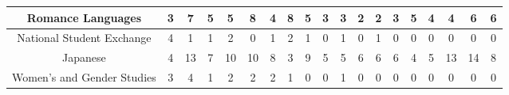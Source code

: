 \documentclass[10]{article}
\begin{document}
\begin{landscape}
\begin{longtable}[c]{|ccccccccccccccccccc|}
	\multicolumn{1}{|c|}{Romance Languages}                          & \multicolumn{1}{c|}{3}          & \multicolumn{1}{c|}{7}          & \multicolumn{1}{c|}{5}          & \multicolumn{1}{c|}{5}          & \multicolumn{1}{c|}{8}          & \multicolumn{1}{c|}{4}          & \multicolumn{1}{c|}{8}          & \multicolumn{1}{c|}{5}          & \multicolumn{1}{c|}{3}          & \multicolumn{1}{c|}{3}          & \multicolumn{1}{c|}{2}          & \multicolumn{1}{c|}{2}          & \multicolumn{1}{c|}{3}          & \multicolumn{1}{c|}{5}          & \multicolumn{1}{c|}{4}          & \multicolumn{1}{c|}{4}          & \multicolumn{1}{c|}{6}          & 6          \\ \hline
	\multicolumn{1}{|c|}{National Student Exchange}                  & \multicolumn{1}{c|}{4}          & \multicolumn{1}{c|}{1}          & \multicolumn{1}{c|}{1}          & \multicolumn{1}{c|}{2}          & \multicolumn{1}{c|}{0}          & \multicolumn{1}{c|}{1}          & \multicolumn{1}{c|}{2}          & \multicolumn{1}{c|}{1}          & \multicolumn{1}{c|}{0}          & \multicolumn{1}{c|}{1}          & \multicolumn{1}{c|}{0}          & \multicolumn{1}{c|}{1}          & \multicolumn{1}{c|}{0}          & \multicolumn{1}{c|}{0}          & \multicolumn{1}{c|}{0}          & \multicolumn{1}{c|}{0}          & \multicolumn{1}{c|}{0}          & 0          \\ \hline
	\multicolumn{1}{|c|}{Japanese}                                   & \multicolumn{1}{c|}{4}          & \multicolumn{1}{c|}{13}         & \multicolumn{1}{c|}{7}          & \multicolumn{1}{c|}{10}         & \multicolumn{1}{c|}{10}         & \multicolumn{1}{c|}{8}          & \multicolumn{1}{c|}{3}          & \multicolumn{1}{c|}{9}          & \multicolumn{1}{c|}{5}          & \multicolumn{1}{c|}{5}          & \multicolumn{1}{c|}{6}          & \multicolumn{1}{c|}{6}          & \multicolumn{1}{c|}{6}          & \multicolumn{1}{c|}{4}          & \multicolumn{1}{c|}{5}          & \multicolumn{1}{c|}{13}         & \multicolumn{1}{c|}{14}         & 8          \\ \hline
	\multicolumn{1}{|c|}{Women's and Gender Studies}                 & \multicolumn{1}{c|}{3}          & \multicolumn{1}{c|}{4}          & \multicolumn{1}{c|}{1}          & \multicolumn{1}{c|}{2}          & \multicolumn{1}{c|}{2}          & \multicolumn{1}{c|}{2}          & \multicolumn{1}{c|}{1}          & \multicolumn{1}{c|}{0}          & \multicolumn{1}{c|}{0}          & \multicolumn{1}{c|}{1}          & \multicolumn{1}{c|}{0}          & \multicolumn{1}{c|}{0}          & \multicolumn{1}{c|}{0}          & \multicolumn{1}{c|}{0}          & \multicolumn{1}{c|}{0}          & \multicolumn{1}{c|}{0}          & \multicolumn{1}{c|}{0}          & 0          \\ \hline

\end{longtable}
\end{landscape}
\end{document}
